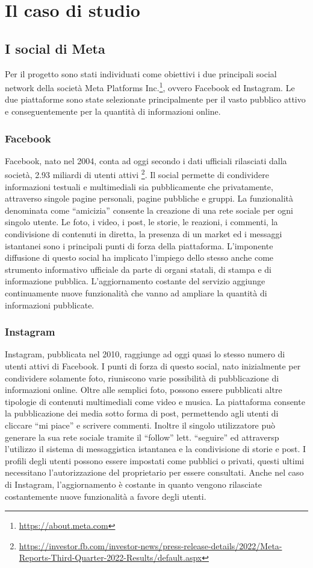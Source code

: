 \chapter{Il caso di studio} \label{chap:caso_studio}
\section{I social di Meta}
Per il progetto sono stati individuati come obiettivi i due principali social network della societ\`a Meta Platforms Inc.\footnote{\url{https://about.meta.com}}, ovvero Facebook ed Instagram. 
Le due piattaforme sono state selezionate principalmente per il vasto pubblico attivo e conseguentemente per la quantit\`a di informazioni online.
\subsection{Facebook}
Facebook, nato nel 2004, conta ad oggi secondo i dati ufficiali rilasciati dalla societ\`a, 2.93 miliardi di utenti attivi  \footnote{\url{https://investor.fb.com/investor-news/press-release-details/2022/Meta-Reports-Third-Quarter-2022-Results/default.aspx}}. Il social permette di condividere informazioni testuali e multimediali sia pubblicamente che privatamente, attraverso singole pagine personali, pagine pubbliche e gruppi. 
La funzionalit\`a denominata come ``amicizia'' consente la creazione di una rete sociale per ogni singolo utente. 
Le foto, i video, i post, le storie, le reazioni, i commenti, la condivisione di contenuti in diretta, la presenza di un market ed i messaggi istantanei sono i principali punti di forza della piattaforma.
L'imponente diffusione di questo social ha implicato l'impiego dello stesso anche come strumento informativo ufficiale da parte di organi statali, di stampa e di informazione pubblica.
L'aggiornamento costante del servizio aggiunge continuamente nuove funzionalit\`a che vanno ad ampliare la quantit\`a di informazioni pubblicate.

\subsection{Instagram}
Instagram, pubblicata nel 2010, raggiunge ad oggi quasi lo stesso numero di utenti attivi di Facebook. I punti di forza di questo social, nato inizialmente per condividere solamente foto, riuniscono varie possibilit\`a di pubblicazione di informazioni online. Oltre alle semplici foto, possono essere pubblicati altre tipologie di contenuti multimediali come video e musica. La piattaforma consente la pubblicazione dei media sotto forma di post, permettendo agli utenti di cliccare ``mi piace'' e scrivere commenti. Inoltre il singolo utilizzatore pu\`o generare la sua rete sociale tramite il ``follow'' lett. ``seguire'' ed attraversp l'utilizzo il sistema di messaggistica istantanea e la condivisione di storie e post.
I profili degli utenti possono essere impostati come pubblici o privati, questi ultimi necessitano l'autorizzazione del proprietario per essere consultati.
Anche nel caso di Instagram, l'aggiornamento \`e costante in quanto vengono rilasciate costantemente nuove funzionalit\`a a favore degli utenti.



